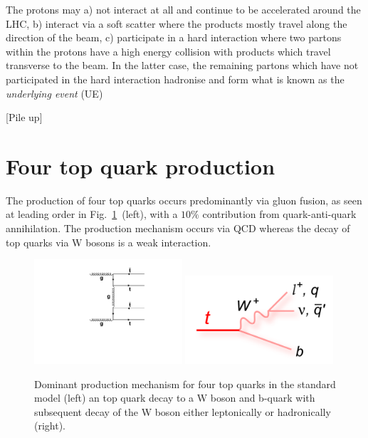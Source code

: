 The protons may a) not interact at all and continue to be accelerated around the LHC, b) interact via a soft scatter where the products mostly travel along the direction of the beam, c) participate in a hard interaction where two partons within the protons have a high energy collision with products which travel transverse to the beam. In the latter case, the remaining partons which have not participated in the hard interaction hadronise and form what is known as the \emph{underlying event} (UE)

[Pile up]


\section{Four top quark production}

The production of four top quarks occurs predominantly via gluon fusion, as seen at leading order in Fig.~\ref{fig:ttttAtLO}~(left), with a $10\%$ contribution from quark-anti-quark annihilation. The production mechanism occurs via QCD whereas the decay of top quarks via W bosons is a weak interaction. 

\begin{figure}[ht!]
\begin{center}
    \includegraphics[width=0.49\textwidth]{images/Theory/tttt_t_LO.pdf}
    \includegraphics[width=0.49\textwidth]{images/Theory/topdecay.png}
    \caption{Dominant production mechanism for four top quarks in the standard model (left) an top quark decay to a W boson and b-quark with subsequent decay of the W boson either leptonically or hadronically (right).}
    \label{fig:ttttAtLO}
\end{center}
\end{figure}

